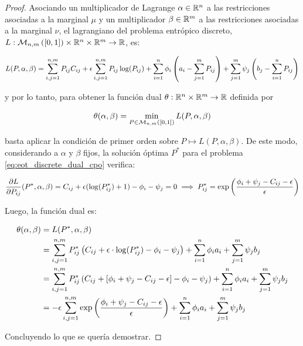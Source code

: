 \begin{proof}
	Asociando un multiplicador de Lagrange $\alpha\in\mathbb{R}^n$ a las restricciones asociadas a la marginal $\mu$ y un multiplicador $\beta\in\mathbb{R}^m$ a las restricciones asociadas a la marginal $\nu$, el lagrangiano del problema entrópico discreto, $L:\mathcal{M}_{n,m}\left([0,1]\right)\times\mathbb{R}^n\times\mathbb{R}^m\to\mathbb{R}$, es:

	\begin{equation}
		L(P,\alpha,\beta) = \sum_{i,j=1}^{n,m} P_{ij}C_{ij} + \epsilon\sum_{i,j=1}^{n,m} P_{ij}\log(P_{ij}) + \sum_{i=1}^n \phi_i \left(a_i - \sum_{j=1}^m P_{ij}\right) + \sum_{j=1}^m \psi_j \left(b_j - \sum_{i=1}^n P_{ij}\right)
	\end{equation}

	y por lo tanto, para obtener la función dual $\theta:\mathbb{R}^n\times\mathbb{R}^m\to\mathbb{R}$ definida por

	\begin{equation}
		\label{eq:eot_discrete_dual_cpo}
		\theta(\alpha,\beta)= \min_{P\in\mathcal{M}_{n,m}\left([0,1]\right)} L(P,\alpha,\beta)
	\end{equation}

	basta aplicar la condición de primer orden sobre $P\mapsto L(P,\alpha,\beta)$. De este modo, considerando a $\alpha$ y $\beta$ fijos, la solución óptima $P^*$ para el problema \eqref{eq:eot_discrete_dual_cpo} verifica:

	\begin{align}
		\frac{\partial L}{\partial P_{ij}}(P^*,\alpha,\beta) = C_{ij} + \epsilon(\log(P_{ij}^*)+1) - \phi_i - \psi_j = 0 \implies P_{ij}^* = \exp\left(\frac{\phi_i + \psi_j-C_{ij} - \epsilon}{\epsilon}\right)
	\end{align}

	Luego, la función dual es:

	\begin{align}
		\theta(\alpha,\beta) & = L(P^*,\alpha,\beta)                                                                                                                                 \\
		                     & = \sum_{i,j=1}^{n,m} P_{ij}^* \left( C_{ij} + \epsilon\cdot\log(P_{ij}^*)- \phi_i-\psi_j \right) + \sum_{i=1}^n \phi_i a_i + \sum_{j=1}^m \psi_j b_j      \\
		                     & = \sum_{i,j=1}^{n,m} P_{ij}^* \left( C_{ij} + [\phi_i+\psi_j-C_{ij}-\epsilon] - \phi_i-\psi_j \right) + \sum_{i=1}^n \phi_i a_i + \sum_{j=1}^m \psi_j b_j \\
		                     & = -\epsilon \sum_{i,j=1}^{n,m} \exp\left(\frac{\phi_i + \psi_j-C_{ij} - \epsilon}{\epsilon}\right) + \sum_{i=1}^n \phi_i a_i + \sum_{j=1}^m \psi_j b_j
	\end{align}

	Concluyendo lo que se quería demostrar.
\end{proof}

